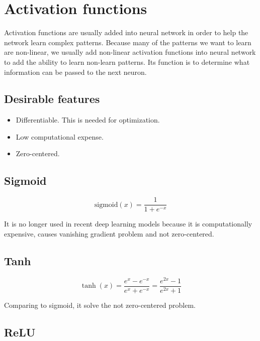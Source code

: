 
\chapter{Activation functions}
\label{cha:activation-functions}

Activation functions are usually added into neural network in order to help the network learn complex patterns.
Because many of the patterns we want to learn are non-linear, we usually add non-linear activation functions into neural network to add the ability to learn non-learn patterns.
Its function is to determine what information can be passed to the next neuron.


\section{Desirable features}
\label{sec:desirable-features}

\begin{itemize}
\item Differentiable. This is needed for optimization.
\item Low computational expense.
\item Zero-centered. 
\end{itemize}

\section{Sigmoid}
\label{sec:sigmoid}

\begin{equation}
  \label{eq:9}
  \text{sigmoid}(x)=\frac{1}{1+e^{-x}}
\end{equation}


It is no longer used in recent deep learning models because it is computationally expensive, causes vanishing gradient problem and not zero-centered.

\section{Tanh}
\label{sec:tanh}

\begin{equation}
  \label{eq:13}
  \tanh(x)=\frac{e^x-e^{-x}}{e^x+e^{-x}}=\frac{e^{2 x}-1}{e^{2 x}+1}
\end{equation}

Comparing to sigmoid, it solve the not zero-centered problem.

\section{ReLU}
\label{sec:relu}

